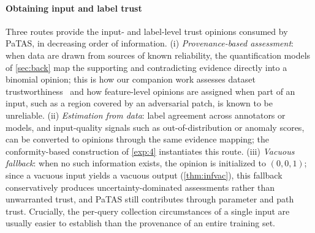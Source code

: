 \paragraph*{Obtaining input and label trust}\label{sec:acquisition}
Three routes provide the input- and label-level trust opinions consumed by PaTAS, in decreasing order of information. (i) \emph{Provenance-based assessment}: when data are drawn from sources of known reliability, the quantification models of \cref{sec:back} map the supporting and contradicting evidence directly into a binomial opinion; this is how our companion work assesses dataset trustworthiness~\cite{10.1007/978-3-032-19096-3_17} and how feature-level opinions are assigned when part of an input, such as a region covered by an adversarial patch, is known to be unreliable. (ii) \emph{Estimation from data}: label agreement across annotators or models, and input-quality signals such as out-of-distribution or anomaly scores, can be converted to opinions through the same evidence mapping; the conformity-based construction of \cref{exp:4} instantiates this route. (iii) \emph{Vacuous fallback}: when no such information exists, the opinion is initialized to \((0,0,1)\); since a vacuous input yields a vacuous output (\cref{thm:infvac}), this fallback conservatively produces uncertainty-dominated assessments rather than unwarranted trust, and PaTAS still contributes through parameter and path trust. Crucially, the per-query collection circumstances of a single input are usually easier to establish than the provenance of an entire training set.


